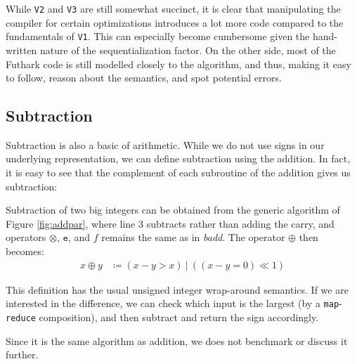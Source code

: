 While \texttt{V2} and \texttt{V3} are still somewhat succinct, it is clear that
manipulating the compiler for certain optimizations introduces a lot more code
compared to the fundamentals of \texttt{V1}. This can especially become
cumbersome given the hand-written nature of the sequentialization factor. On the
other side, most of the Futhark code is still modelled closely to the algorithm,
and thus, making it easy to follow, reason about the semantics, and spot
potential errors.

\subsection{Subtraction}
\label{subsec:sub}

Subtraction is also a basic of arithmetic. While we do not use signs in our
underlying representation, we can define subtraction using the addition. In
fact, it is easy to see that the complement of each subroutine of the addition
gives us subtraction:

\begin{definition}
  Subtraction of two big integers can be obtained from the generic algorithm of
  Figure \ref{fig:addpar}, where line 3 subtracts rather than adding the carry,
  and operators $\otimes$, $\mathtt{e}$, and $f$ remains the same as in
  \textit{badd}. The operator $\oplus$ then becomes:
\begin{align}
  \label{eq:oplussub}
  x \oplus y &\coloneq (x - y > x)~|~((x - y = 0) \ll 1)
\end{align}
\end{definition}

This definition has the usual unsigned integer wrap-around semantics. If we are
interested in the difference, we can check which input is the largest (by a
\texttt{map}-\texttt{reduce} composition), and then subtract and return the sign
accordingly.

Since it is the same algorithm as addition, we does not benchmark or discuss it
further.

